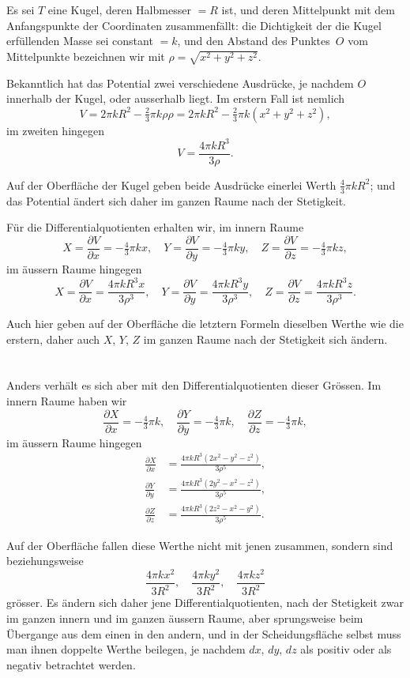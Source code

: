 \documentclass[12pt,a4paper]{article}
\begin{document}
Es sei $T$ eine Kugel, deren Halbmesser $=R$ ist, und deren Mittelpunkt
mit dem Anfangspunkte der Coordinaten zusammenfällt: die Dichtigkeit der die
Kugel erfüllenden Masse sei constant $=k$, und den Abstand des Punktes~$O$
vom Mittelpunkte bezeichnen wir mit $\rho=\sqrt{x^2+y^2+z^2}$.

Bekanntlich hat das Potential zwei verschiedene Ausdrücke, je nachdem $O$ innerhalb der Kugel, oder ausserhalb liegt. Im erstern Fall ist nemlich
\[
V = 2\pi k R^2 - \tfrac{2}{3}\pi k\rho\rho
  = 2\pi k R^2 - \tfrac{2}{3}\pi k(x^2+y^2+z^2),
\]
im zweiten hingegen
\[
V = \frac{4\pi k R^3}{3\rho}.
\]

Auf der Oberfläche der Kugel geben beide Ausdrücke einerlei Werth $\tfrac{4}{3}\pi k R^2$;
und das Potential ändert sich daher im ganzen Raume nach der Stetigkeit.

Für die Differentialquotienten erhalten wir, im innern Raume
\[
X = \frac{\partial V}{\partial x} = -\tfrac{4}{3}\pi k x,\quad
Y = \frac{\partial V}{\partial y} = -\tfrac{4}{3}\pi k y,\quad
Z = \frac{\partial V}{\partial z} = -\tfrac{4}{3}\pi k z,
\]
im äussern Raume hingegen
\[
X = \frac{\partial V}{\partial x} = \frac{4\pi k R^3 x}{3\rho^3},\quad
Y = \frac{\partial V}{\partial y} = \frac{4\pi k R^3 y}{3\rho^3},\quad
Z = \frac{\partial V}{\partial z} = \frac{4\pi k R^3 z}{3\rho^3}.
\]

Auch hier geben auf der Oberfläche die letztern Formeln dieselben Werthe
wie die erstern, daher auch $X$, $Y$, $Z$ im ganzen Raume nach der Stetigkeit sich
ändern.

\section{}
Anders verhält es sich aber mit den Differentialquotienten dieser Grössen.
Im innern Raume haben wir
\[
\frac{\partial X}{\partial x} = -\tfrac{4}{3}\pi k,\quad
\frac{\partial Y}{\partial y} = -\tfrac{4}{3}\pi k,\quad
\frac{\partial Z}{\partial z} = -\tfrac{4}{3}\pi k,
\]
im äussern Raume hingegen
\begin{align*}
\frac{\partial X}{\partial x} &= \frac{4\pi k R^3(2x^2-y^2-z^2)}{3\rho^5},\\
\frac{\partial Y}{\partial y} &= \frac{4\pi k R^3(2y^2-x^2-z^2)}{3\rho^5},\\
\frac{\partial Z}{\partial z} &= \frac{4\pi k R^3(2z^2-x^2-y^2)}{3\rho^5}.
\end{align*}

Auf der Oberfläche fallen diese Werthe nicht mit jenen zusammen, sondern
sind beziehungsweise
\[
\frac{4\pi k x^2}{3R^2},\quad \frac{4\pi k y^2}{3R^2},\quad \frac{4\pi k z^2}{3R^2}
\]
grösser. Es ändern sich daher jene Differentialquotienten, nach der Stetigkeit
zwar im ganzen innern und im ganzen äussern Raume, aber sprungsweise beim
Übergange aus dem einen in den andern, und in der Scheidungsfläche selbst muss
man ihnen doppelte Werthe beilegen, je nachdem $dx$, $dy$, $dz$ als positiv oder
als negativ betrachtet werden.
\end{document}
